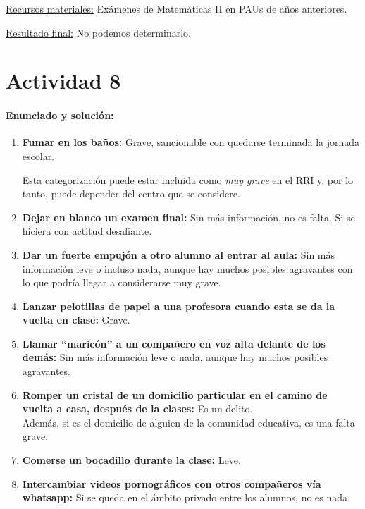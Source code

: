 {\ul{Recursos materiales:}
Exámenes de Matemáticas II en PAUs de años anteriores.


\ul{Resultado final:}
No podemos determinarlo.



\newpage
\section*{Actividad 8}
\paragraph{Enunciado y solución:}

\begin{enumerate}
	\item \textbf{Fumar en los baños: } Grave, sancionable con quedarse terminada la jornada escolar.

	\subitem Esta categorización puede estar incluida como \textit{muy grave} en el RRI y, por lo tanto, puede depender del centro que se considere.

	\item \textbf{Dejar en blanco un examen final: } Sin más información, no es falta.
 Si se hiciera con actitud desafiante.

	\item \textbf{Dar un fuerte empujón a otro alumno al entrar al aula: } Sin más información leve o incluso nada, aunque hay muchos posibles agravantes con lo que podría llegar a considerarse muy grave.

	\item \textbf{Lanzar pelotillas de papel a una profesora cuando esta se da la vuelta en clase: } Grave.

	\item \textbf{Llamar “maricón” a un compañero en voz alta delante de los demás: } Sin más información leve o nada, aunque hay muchos posibles agravantes.

	\item \textbf{Romper un cristal de un domicilio particular en el camino de vuelta a casa, después de la clases: } Es un delito.\\
 Además, si es el domicilio de alguien de la comunidad educativa, es una falta grave.
 
	\item \textbf{Comerse un bocadillo durante la clase: } Leve.

	\item \textbf{Intercambiar videos pornográficos con otros compañeros vía whatsapp: } Si se queda en el ámbito privado entre los alumnos, no es nada.


\end{enumerate}}
